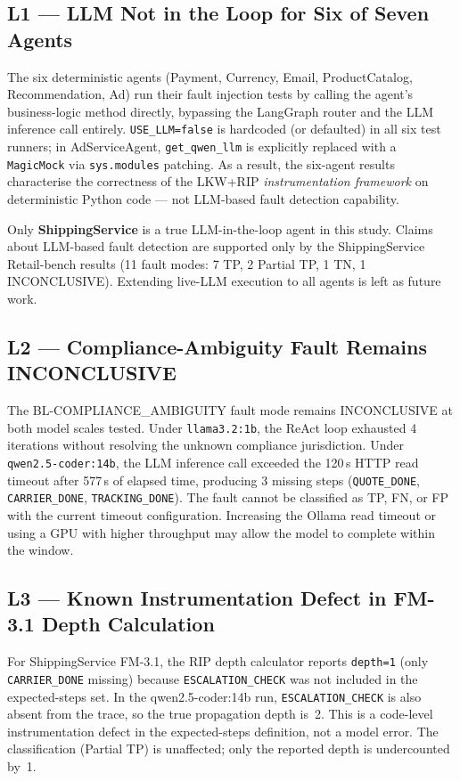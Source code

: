 \documentclass[conference]{IEEEtran}
\begin{document}
\subsection{L1 --- LLM Not in the Loop for Six of Seven Agents}

The six deterministic agents (Payment, Currency, Email, ProductCatalog,
Recommendation, Ad) run their fault injection tests by calling the agent's
business-logic method directly, bypassing the LangGraph router and the LLM
inference call entirely. \texttt{USE\_LLM=false} is hardcoded (or defaulted) in
all six test runners; in AdServiceAgent, \texttt{get\_qwen\_llm} is explicitly
replaced with a \texttt{MagicMock} via \texttt{sys.modules} patching. As a
result, the six-agent results characterise the correctness of the LKW+RIP
\emph{instrumentation framework} on deterministic Python code --- not LLM-based
fault detection capability.

Only \textbf{ShippingService} is a true LLM-in-the-loop agent in this study.
Claims about LLM-based fault detection are supported only by the ShippingService
Retail-bench results (11 fault modes: 7 TP, 2 Partial TP, 1 TN, 1 INCONCLUSIVE).
Extending live-LLM execution to all agents is left as future work.

\subsection{L2 --- Compliance-Ambiguity Fault Remains INCONCLUSIVE}

The BL-COMPLIANCE\_AMBIGUITY fault mode remains INCONCLUSIVE at both model
scales tested. Under \texttt{llama3.2:1b}, the ReAct loop exhausted 4 iterations
without resolving the unknown compliance jurisdiction. Under
\texttt{qwen2.5-coder:14b}, the LLM inference call exceeded the 120\,s HTTP read
timeout after 577\,s of elapsed time, producing 3 missing steps
(\texttt{QUOTE\_DONE}, \texttt{CARRIER\_DONE}, \texttt{TRACKING\_DONE}). The
fault cannot be classified as TP, FN, or FP with the current timeout
configuration. Increasing the Ollama read timeout or using a GPU with higher
throughput may allow the model to complete within the window.

\subsection{L3 --- Known Instrumentation Defect in FM-3.1 Depth Calculation}

For ShippingService FM-3.1, the RIP depth calculator reports \texttt{depth=1}
(only \texttt{CARRIER\_DONE} missing) because \texttt{ESCALATION\_CHECK} was
not included in the expected-steps set. In the qwen2.5-coder:14b run,
\texttt{ESCALATION\_CHECK} is also absent from the trace, so the true
propagation depth is~2. This is a code-level instrumentation defect in the
expected-steps definition, not a model error. The classification (Partial TP)
is unaffected; only the reported depth is undercounted by~1.
\end{document}
